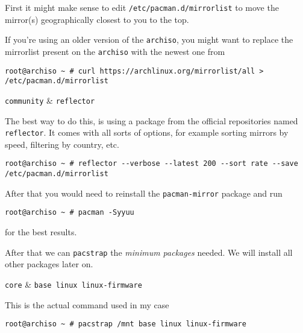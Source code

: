 \documentclass[10pt]{dustdoc}
\begin{document}
First it might make sense to edit \texttt{/etc/pacman.d/mirrorlist} to move the mirror(s) geographically closest to you to the top.

If you're using an older version of the \texttt{archiso}, you might want to replace the mirrorlist present on the \texttt{archiso} with the newest one from 

\begin{verbatim}
root@archiso ~ # curl https://archlinux.org/mirrorlist/all > /etc/pacman.d/mirrorlist
\end{verbatim}

\begin{NOTE}
    \begin{packagetable}
        \texttt{community} & \texttt{reflector} \\
    \end{packagetable}

    The best way to do this, is using a package from the official repositories named \texttt{reflector}.
    It comes with all sorts of options, for example sorting mirrors by speed, filtering by country, etc.

    \begin{verbatim}
root@archiso ~ # reflector --verbose --latest 200 --sort rate --save /etc/pacman.d/mirrorlist
    \end{verbatim}

    After that you would need to reinstall the \texttt{pacman-mirror} package and run

    \begin{verbatim}
root@archiso ~ # pacman -Syyuu
    \end{verbatim}

    \noindent
    for the best results.
\end{NOTE}

After that we can \texttt{pacstrap} the \emph{minimum packages} needed.
We will install all other packages later on.

\begin{packagetable}
    \texttt{core} & \texttt{base linux linux-firmware} \\
\end{packagetable}

\begin{NOTE}
    This is the actual command used in my case

    \begin{verbatim}
root@archiso ~ # pacstrap /mnt base linux linux-firmware
    \end{verbatim}
\end{NOTE}
\end{document}
